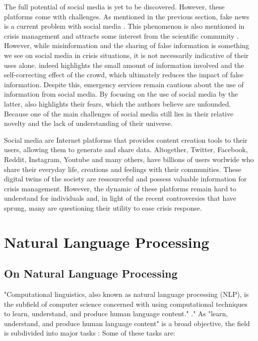 The full potential of social media is yet to be discovered.
However, these platforms come with challenges.
As mentioned in the previous section, fake news is a current problem with social media \cite{lazerScienceFakeNews2018,vosoughiSpreadTrueFalse2018,oshikawaSurveyNaturalLanguage2018}.
This phenomenon is also mentioned in crisis management and attracts some interest from the scientific community \cite{starbirdExaminingAlternativeMedia2017,sellMisinformationUSEbola2020}.
However, while misinformation and the sharing of false information is something we see on social media in crisis situations, it is not necessarily indicative of their uses alone.
\cite{bubendorffConstructionDisseminationInformation2021} indeed highlights the small amount of information involved and the self-correcting effect of the crowd, which ultimately reduces the impact of false information.
Despite this, emergency services remain cautious about the use of information from social media.
By focusing on the use of social media by the latter, \cite{tapiaGoodEnoughGood2014} also highlights their fears, which the authors believe are unfounded.
Because one of the main challenges of social media still lies in their relative novelty and the lack of understanding of their universe.

Social media are Internet platforms that provides content creation tools to their users, allowing them to generate and share data.
Altogether, Twitter, Facebook, Reddit, Instagram, Youtube and many others, have billions of users worlwide who share their everyday life, creations and feelings with their communities.
These digital twins of the society are ressourceful and possess valuable information for crisis management.
However, the dynamic of these platforms remain hard to understand for individuals and, in light of the recent controversies that have sprung, many are questioning their utility to ease crisis response.

\section{Natural Language Processing}
\subsection{On Natural Language Processing}
"Computational linguistics, also known as natural language processing (NLP), is the subfield of computer science concerned with using computational techniques to learn, understand, and produce human language content." \cite{hirschbergAdvancesNaturalLanguage2015}."
As "learn, understand, and produce human language content" is a broad objective, the field is subdivided into major tasks :
Some of these tasks are:

